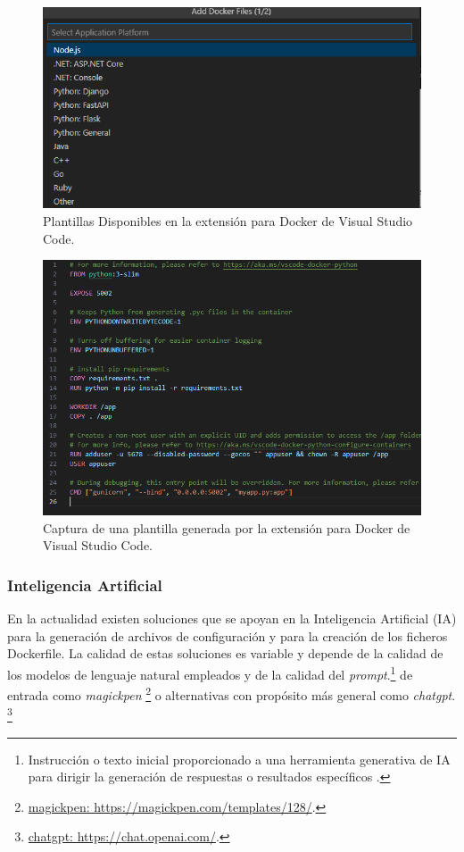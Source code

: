 \documentclass[12pt, a4paper, twoside]{article}
\begin{document}
\begin{figure}[ht]
	\centering
	  \includegraphics[width=1\textwidth]{Docker.extension.vscode.png}
	\caption{Plantillas Disponibles en la extensión para Docker de Visual Studio Code.}
\end{figure}

\begin{figure}[ht]
	\centering
		\includegraphics[width=1\textwidth]{docker.extension.vscode.Dockerfile.png}
	\caption{Captura de una plantilla generada por la extensión para Docker de Visual Studio Code.}
\end{figure}

\subsubsection{Inteligencia Artificial}
En la actualidad existen soluciones que se apoyan en la Inteligencia Artificial (IA) para la generación de archivos de configuración y para la creación de los ficheros Dockerfile. 
La calidad de estas soluciones es variable y depende de la calidad de los modelos de lenguaje natural empleados y de la calidad del \emph{prompt}.\footnote{Instrucción o texto inicial proporcionado a una herramienta generativa de IA para dirigir la generación de respuestas o resultados específicos \cite{panamericanlatam_prompt_ia}.} de entrada como \emph{magickpen} \cite{magickpen_dockerfile_template}\footnote{\href{https://magickpen.com/templates/128/}{magickpen: https://magickpen.com/templates/128/}.} o alternativas con propósito más general como \emph{chatgpt}. \cite{chatgpt} \footnote{\href{https://chat.openai.com/}{chatgpt: https://chat.openai.com/}.}
\end{document}
